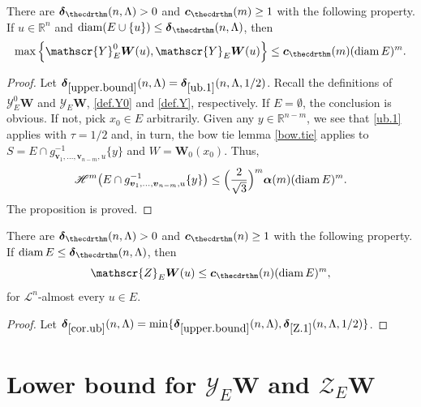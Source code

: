 \documentclass[JEP,XML,SOM,Unicode,ThmDefs,NoEqCountersInSection]{cedram}
\newcommand{\R}{\mathbb{R}}
\newcommand{\Rn}{\R^n}
\newcommand{\calH}{\mathscr{H}}
\newcommand{\calL}{\mathscr{L}}
\newcommand{\calY}{\mathscr{Y}}
\newcommand{\calZ}{\mathscr{Z}}
\newcommand{\balpha}{\boldsymbol{\alpha}}
\newcommand{\bdelta}{\boldsymbol{\delta}}
\newcommand{\bW}{{\boldsymbol{W}}}
\newcommand{\bc}{{\boldsymbol{c}}}
\newcommand{\bv}{{\boldsymbol{v}}}
\DeclareMathOperator{\rmdiam}{\mathrm{diam}}
\begin{document}
\begin{Proposition}
\label{upper.bound}
There are $\bdelta_{\thecdrthm}(n,\Lambda) > 0$ and $\bc_{\thecdrthm}(m) \geq 1$ with the following property. If $u \in \Rn$ and $\rmdiam (E \cup \{u\}) \leq \bdelta_{\thecdrthm}(n,\Lambda)$, then
\begin{equation*}
\max \left\{ \calY^0_E \bW(u), \calY_E \bW(u)\right\} \leq \bc_{\thecdrthm}(m) (\rmdiam E)^m.
\end{equation*}
\end{Proposition}

\begin{proof}
Let $\bdelta_{\ref{upper.bound}}(n,\Lambda) =\bdelta_{\ref{ub.1}}(n,\Lambda,1/2)$.
Recall the definitions of $\calY^0_E \bW$ and $\calY_E \bW$, \ref{def.Y0} and \ref{def.Y}, respectively.
If $E =\emptyset$, the conclusion is obvious.
If not, pick $x_0 \in E$ arbitrarily.
Given any $y \in \R^{n-m}$, we see that \ref{ub.1} applies with $\tau = 1/2$ and, in turn, the bow tie lemma \ref{bow.tie} applies to $S = E \cap g_{\bv_1,\ldots,\bv_{n-m},u}^{-1}\{y\}$ and $W = \bW_0(x_0)$.
Thus,
\begin{equation*}
\calH^m \bigl(E \cap g_{\bv_1,\ldots,\bv_{n-m},u}^{-1}\{y\} \bigr) \leq \Bigl(\frac{2}{\sqrt{3}}\Bigr)^m \balpha(m) (\rmdiam E)^m.
\end{equation*}
The proposition is proved.
\end{proof}

\begin{corollary}
\label{cor.ub}
There are $\bdelta_{\thecdrthm}(n,\Lambda) > 0$ and $\bc_{\thecdrthm}(n) \geq 1$ with the following property. If $\rmdiam E \leq \bdelta_{\thecdrthm}(n,\Lambda)$, then
\begin{equation*}
\calZ_E \bW(u) \leq \bc_{\thecdrthm}(n) (\rmdiam E)^m,
\end{equation*}
for $\calL^n$-almost every $u \in E$.
\end{corollary}

\begin{proof}
Let $\bdelta_{\ref{cor.ub}}(n,\Lambda) = \min\{ \bdelta_{\ref{upper.bound}}(n,\Lambda),\bdelta_{\ref{Z.1}}(n,\Lambda,1/2) \}$.
\end{proof}

\section{Lower bound for \texorpdfstring{$\calY_E \bW$ and $\calZ_E \bW$}{YW}}\label{sec:7}
\end{document}
